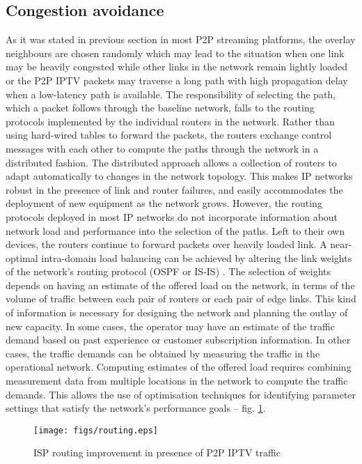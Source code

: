\documentclass[10pt, conference, compsocconf]{IEEEtran}
\begin{document}
\subsection{Congestion avoidance}
As it was stated in previous section in most P2P streaming platforms, the overlay neighbours are chosen randomly which may lead to the situation when one link may be heavily congested while other links in the network remain lightly loaded or the P2P IPTV packets may traverse a long path with high propagation delay when a low-latency path is available. The responsibility of selecting the path, which a packet follows through the baseline network, falls to the routing protocols implemented by the individual routers in the network. Rather than using hard-wired tables to forward the packets, the routers exchange control messages with each other to compute the paths through the network in a distributed fashion. The distributed approach allows a collection of routers to adapt automatically to changes in the network topology. This makes IP networks robust in the presence of link and router failures, and easily accommodates the deployment of new equipment as the network grows. However, the routing protocols deployed in most IP networks do not incorporate information about network load and performance into the selection of the paths. Left to their own devices, the routers continue to forward packets over heavily loaded link. A near-optimal intra-domain load balancing can be achieved by altering the link weights of the network’s routing protocol (OSPF or IS-IS) \cite{rexford_route_2005}. The selection of weights depends on having an estimate of the offered load on the network, in terms of the volume of traffic between each pair of routers or each pair of edge links. This kind of information is necessary for designing the network and planning the outlay of new capacity. In some cases, the operator may have an estimate of the traffic demand based on past experience or customer subscription information. In other cases, the traffic demands can be obtained by measuring the traffic in the operational network. Computing estimates of the offered load requires combining measurement data from multiple locations in the network to compute the traffic demands. This allows the use of optimisation techniques for identifying parameter settings that satisfy the network's performance goals -- fig. \ref{fig:routing}.

\begin{figure}[!t]
\centering
\texttt{[image: figs/routing.eps]}
\caption{ISP routing improvement in presence of P2P IPTV traffic}
\label{fig:routing}
\end{figure}
\end{document}
